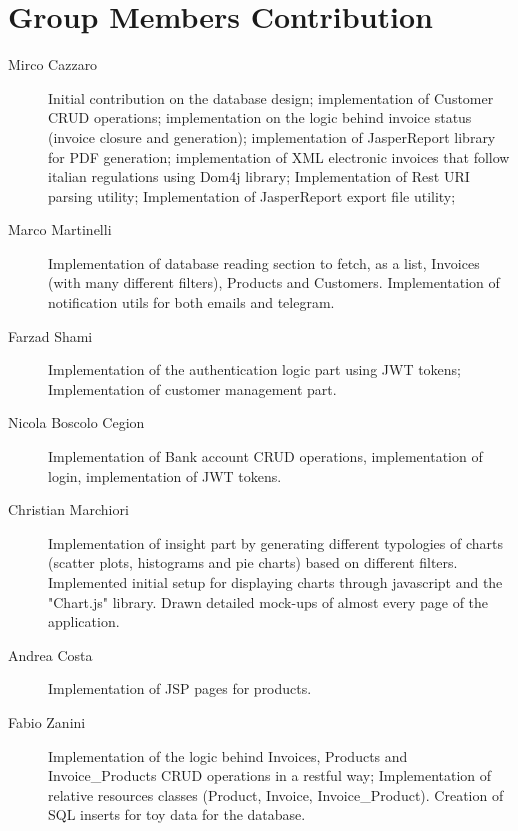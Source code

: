 \section{Group Members Contribution}


\begin{description}
	\item[Mirco Cazzaro] Initial contribution on the database design; implementation of Customer CRUD operations; implementation on the logic behind invoice status (invoice closure and generation); implementation of JasperReport library for PDF generation; implementation of XML electronic invoices that follow italian regulations using Dom4j library; Implementation of Rest URI parsing utility; Implementation of JasperReport export file utility;
	\item[Marco Martinelli] Implementation of database reading section to fetch, as a list, Invoices (with many different filters), Products and Customers. Implementation of notification utils for both emails and telegram. 
	\item[Farzad Shami] Implementation of the authentication logic part using JWT tokens; Implementation of customer management part.
	\item[Nicola Boscolo Cegion] Implementation of Bank account CRUD operations, implementation of login, implementation of JWT tokens.
	\item[Christian Marchiori] Implementation of insight part by generating different typologies of charts (scatter plots, histograms and pie charts) based on different filters. Implemented initial setup for displaying charts through javascript and the "Chart.js" library. Drawn detailed mock-ups of almost every page of the application.
	\item[Andrea Costa] Implementation of JSP pages for products.
	\item[Fabio Zanini] Implementation of the logic behind Invoices, Products and Invoice\_Products CRUD operations in a restful way; Implementation of relative resources classes (Product, Invoice, Invoice\_Product). Creation of SQL inserts for toy data for the database.
\end{description}
